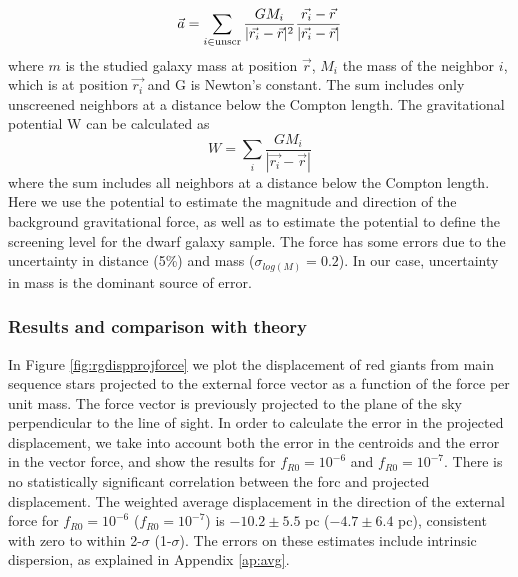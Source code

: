 \documentclass[twocolappendix, numberedappendix]{emulateapj}
\newcommand{\jakesays}[1]{{\color{red}[Jake says: #1]}}
\begin{document}
\begin{equation}
\vec{a} =\sum_{i \in {\rm unscr}}{\frac{G M_i}{|\vec{r_i}
-\vec{r}|^2} \frac{\vec{r_i}
-\vec{r}}{|\vec{r_i} -\vec{r}|} }
\label{eq:accelaration}
\end{equation}
where $m$ is the studied galaxy mass at position $\vec{r}$,
 $M_i$ the mass of the
neighbor $i$, which is at position $\vec{r_i}$ and G is Newton's
constant. The sum includes only unscreened neighbors at a distance below the
Compton length. 
The gravitational potential W can be calculated as 
\begin{equation}
 W=\sum_i{\frac{G M_i}{|\vec{r_i} -\vec{r}|}  }
\end{equation}
where the sum includes all neighbors at a distance below the Compton length.
Here we use the potential to estimate the magnitude and direction of the
background gravitational force, as well as to estimate the potential to
define the screening level for the dwarf galaxy sample.
The force has some errors due to the
uncertainty in distance (5\%) and mass ($\sigma_{log(M)}=0.2$).
In our case, uncertainty in mass is the
dominant source of error. 

\subsubsection{Results and comparison with theory}
In Figure \ref{fig:rgdispprojforce} we plot the displacement of red
giants from  main sequence stars projected to the external force vector as a 
function of the force per unit mass. The force vector is previously
projected to the plane of the sky perpendicular to the line of sight.
In order to calculate the error in the projected displacement, 
we take into account both the error in the centroids and the error in the
vector force, and show the results for $f_{R0}=10^{-6}$ and $f_{R0}=10^{-7}$.
There is no statistically significant correlation between the forc and
projected displacement.
The weighted average displacement in the direction of the 
external force for $f_{R0} = 10^{-6}$ ($f_{R0} = 10^{-7}$) is
$-10.2\pm5.5$ pc ($-4.7\pm6.4$ pc),
consistent with zero to within 2-$\sigma$ (1-$\sigma$).
The errors on these estimates include intrinsic dispersion, as explained
in Appendix \ref{ap:avg}.
\end{document}
